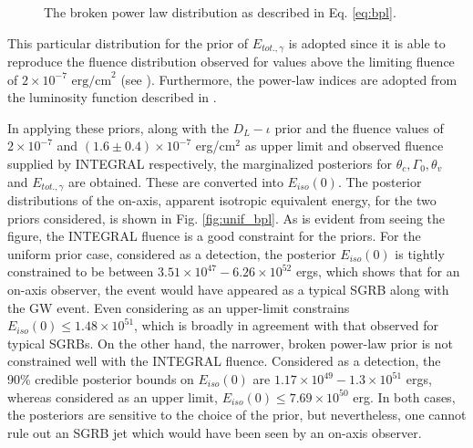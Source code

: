     \begin{figure}[H]
        \centering
        \def\svgwidth{0.8\textwidth}
        
        \caption[Broken power law distribution from \cite{ghirlanda_2016}.]
        {
            The broken power law distribution as described in Eq. \ref{eq:bpl}.
        }
        \label{fig:bpl_demo}
    \end{figure}

    This particular distribution for the prior of $E_{tot., \gamma}$ is adopted since it
    is able to reproduce the fluence distribution observed for values above the
    limiting fluence of $2 \times 10^{-7} \text{ erg/cm}^2$ (see \cite{mohan_2019}).
    Furthermore, the power-law indices are adopted from the luminosity function
    described in \cite{ghirlanda_2016}.

    In applying these priors, along with the $D_L-\iota$ prior and the fluence values of
    $2 \times 10^{-7}$ and $(1.6 \pm 0.4) \times 10^{-7}$ erg/cm$^2$ as upper limit and
    observed fluence supplied by INTEGRAL respectively, the marginalized posteriors for
    $\theta_c, \Gamma_0, \theta_v$ and $E_{tot., \gamma}$ are obtained. These are
    converted into $E_{iso}(0)$. The posterior distributions of the on-axis, apparent
    isotropic equivalent energy, for the two priors considered, is shown in Fig.
    \ref{fig:unif_bpl}. As is evident from seeing the figure, the INTEGRAL fluence is a
    good constraint for the priors. For the uniform prior case, considered as a
    detection, the posterior $E_{iso}(0)$ is tightly constrained to be between
    $3.51\times 10^{47} - 6.26 \times 10^{52}$ ergs, which shows that for an on-axis
    observer, the event would have appeared as a typical SGRB along with the GW event.
    Even considering as an upper-limit constrains $E_{iso}(0) \leq 1.48\times 10^{51}$,
    which is broadly in agreement with that observed for typical SGRBs.  On the other
    hand, the narrower, broken power-law prior is not constrained well with the INTEGRAL
    fluence. Considered as a detection, the 90\% credible posterior bounds on
    $E_{iso}(0)$ are $1.17\times10^{49}-1.3\times10^{51}$ ergs, whereas considered as an
    upper limit, $E_{iso}(0) \leq 7.69 \times 10^{50}$ erg. In both cases, the
    posteriors are sensitive to the choice of the prior, but nevertheless, one cannot
    rule out an SGRB jet which would have been seen by an on-axis observer.

